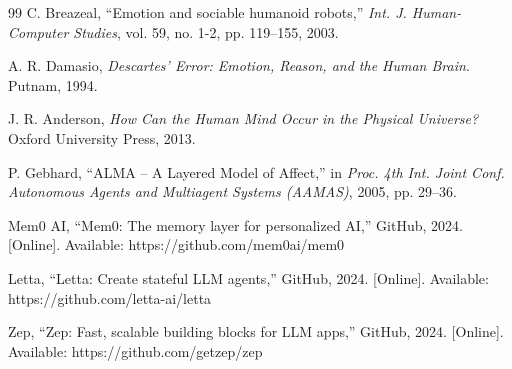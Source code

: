 \documentclass[journal,twoside]{IEEEtran}
\begin{document}
\begin{thebibliography}{99}
C. Breazeal, ``Emotion and sociable humanoid robots,'' \textit{Int. J. Human-Computer Studies}, vol. 59, no. 1-2, pp. 119--155, 2003.

A. R. Damasio, \textit{Descartes' Error: Emotion, Reason, and the Human Brain}. Putnam, 1994.

J. R. Anderson, \textit{How Can the Human Mind Occur in the Physical Universe?} Oxford University Press, 2013.

P. Gebhard, ``ALMA -- A Layered Model of Affect,'' in \textit{Proc. 4th Int. Joint Conf. Autonomous Agents and Multiagent Systems (AAMAS)}, 2005, pp. 29--36.

Mem0 AI, ``Mem0: The memory layer for personalized AI,'' GitHub, 2024. [Online]. Available: https://github.com/mem0ai/mem0

Letta, ``Letta: Create stateful LLM agents,'' GitHub, 2024. [Online]. Available: https://github.com/letta-ai/letta

Zep, ``Zep: Fast, scalable building blocks for LLM apps,'' GitHub, 2024. [Online]. Available: https://github.com/getzep/zep

\end{thebibliography}
\end{document}
